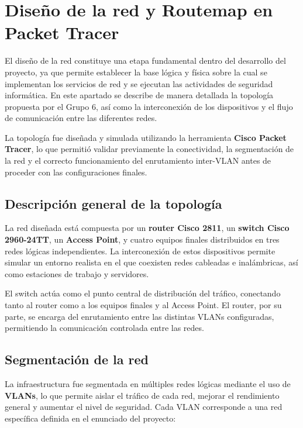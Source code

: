 \section{Diseño de la red y Routemap en Packet Tracer}

El diseño de la red constituye una etapa fundamental dentro del desarrollo del proyecto, ya que permite establecer la base lógica y física sobre la cual se implementan los servicios de red y se ejecutan las actividades de seguridad informática. En este apartado se describe de manera detallada la topología propuesta por el Grupo 6, así como la interconexión de los dispositivos y el flujo de comunicación entre las diferentes redes.

La topología fue diseñada y simulada utilizando la herramienta \textbf{Cisco Packet Tracer}, lo que permitió validar previamente la conectividad, la segmentación de la red y el correcto funcionamiento del enrutamiento inter-VLAN antes de proceder con las configuraciones finales.

\subsection{Descripción general de la topología}

La red diseñada está compuesta por un \textbf{router Cisco 2811}, un \textbf{switch Cisco 2960-24TT}, un \textbf{Access Point}, y cuatro equipos finales distribuidos en tres redes lógicas independientes. La interconexión de estos dispositivos permite simular un entorno realista en el que coexisten redes cableadas e inalámbricas, así como estaciones de trabajo y servidores.

El switch actúa como el punto central de distribución del tráfico, conectando tanto al router como a los equipos finales y al Access Point. El router, por su parte, se encarga del enrutamiento entre las distintas VLANs configuradas, permitiendo la comunicación controlada entre las redes.

\subsection{Segmentación de la red}

La infraestructura fue segmentada en múltiples redes lógicas mediante el uso de \textbf{VLANs}, lo que permite aislar el tráfico de cada red, mejorar el rendimiento general y aumentar el nivel de seguridad. Cada VLAN corresponde a una red específica definida en el enunciado del proyecto:


